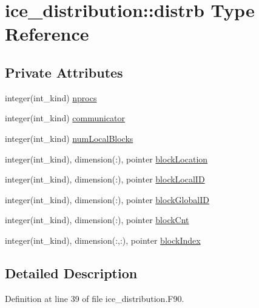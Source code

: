 \hypertarget{typeice__distribution_1_1distrb}{
\section{ice\_\-distribution::distrb Type Reference}
\label{typeice__distribution_1_1distrb}
}
\subsection*{Private Attributes}
\begin{DoxyCompactItemize}
\item 
integer(int\_\-kind) \hyperlink{typeice__distribution_1_1distrb_a31fd7407975e1cc030ff11a0fb6d93f4}{nprocs}
\item 
integer(int\_\-kind) \hyperlink{typeice__distribution_1_1distrb_a3186ecdfee930115046bc3e5bc3769f4}{communicator}
\item 
integer(int\_\-kind) \hyperlink{typeice__distribution_1_1distrb_a77445778980d100ef8889ecbf5e3ab9d}{numLocalBlocks}
\item 
integer(int\_\-kind), dimension(:), pointer \hyperlink{typeice__distribution_1_1distrb_ab2bb142e943e3f626068050abcba030f}{blockLocation}
\item 
integer(int\_\-kind), dimension(:), pointer \hyperlink{typeice__distribution_1_1distrb_a407e3ec4f86d4118d4ba1fd491e0113c}{blockLocalID}
\item 
integer(int\_\-kind), dimension(:), pointer \hyperlink{typeice__distribution_1_1distrb_af2b95b1f97c77038575133106fa9922a}{blockGlobalID}
\item 
integer(int\_\-kind), dimension(:), pointer \hyperlink{typeice__distribution_1_1distrb_a716214843ba2cf03a241962abe8f0b6e}{blockCnt}
\item 
integer(int\_\-kind), dimension(:,:), pointer \hyperlink{typeice__distribution_1_1distrb_a94868e55b2859dbebbe89bd75146395f}{blockIndex}
\end{DoxyCompactItemize}


\subsection{Detailed Description}


Definition at line 39 of file ice\_\-distribution.F90.

